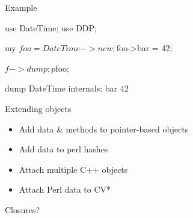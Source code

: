 \documentclass[mathserif,hyperref={urlcolor=cyan,colorlinks=true}]{beamer}
\begin{document}
\begin{frame}[fragile]{Example}
\begin{perlcode}
use DateTime;
use DDP;

my $foo = DateTime->new;
$foo->{bar} = 42;

$f->dump;
p $foo;
\end{perlcode}
\pause
\begin{bashcode}
dump
DateTime    {
    internals:  {
        bar 42
    }
}
\end{bashcode}
\end{frame}

\begin{frame}{Extending objects}
\begin{itemize}
\item Add data \& methods to pointer-based objects
\item Add data to perl hashes
\item Attach multiple C++ objects
\item Attach Perl data to CV*
\end{itemize}
\end{frame}

\begin{frame}{}
\begin{figure}
\end{figure}
\end{frame}

\begin{frame}[fragile]{Closures?}
\end{frame}
\end{document}
